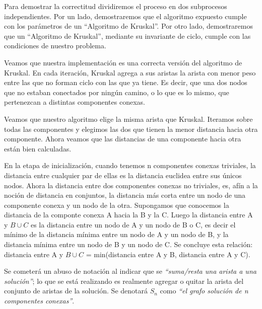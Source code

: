 \documentclass[11pt, a4paper, twoside]{article}
\begin{document}
{}

Para demostrar la correctitud dividiremos el proceso en dos subprocesos
independientes. Por un lado, demostraremos que el algoritmo expuesto cumple
con los parámetros de un ``Algoritmo de Kruskal''. Por otro lado,
demostraremos que un ``Algoritmo de Kruskal'', mediante su invariante de
ciclo, cumple con las condiciones de nuestro problema.


Veamos que nuestra implementación es una correcta versión del algoritmo de
Kruskal. En cada iteración, Kruskal agrega a sus aristas la arista con menor
peso entre las que no forman ciclo con las que ya tiene. Es decir, que una dos
nodos que no estaban conectados por ningún camino, o lo que es lo mismo, que
pertenezcan a distintas componentes conexas.

Veamos que nuestro algoritmo elige la misma arista que Kruskal. Iteramos sobre
todas las componentes y elegimos las dos que tienen la menor distancia hacia
otra componente. Ahora veamos que las distancias de una componente hacia otra
están bien calculadas.

En la etapa de inicialización, cuando tenemos n componentes conexas triviales,
la distancia entre cualquier par de ellas es la distancia euclidea entre sus
únicos nodos. Ahora la distancia entre dos componentes conexas no triviales,
es, afín a la noción de distancia en conjuntos, la distancia más corta entre
un nodo de una componente conexa y un nodo de la otra. Supongamos que
conocemos la distancia de la componte conexa A hacia la B y la C. Luego la
distancia entre A y $B \cup C$ es la distancia entre un nodo de A y un nodo de
B o C, es decir el mínimo de la distancia mínima entre un nodo de A y un nodo
de B, y la distancia mínima entre un nodo de B y un nodo de C. Se concluye
esta relación: distancia entre A y $B \cup C$ = min(distancia entre A y B,
distancia entre A y C).


\begin{aclaracion}

Se cometerá un abuso de notación al indicar que se \emph{``suma/resta una
arista a una solución''}; lo que se está realizando es realmente agregar o
quitar la arista del conjunto de aristas de la solución. Se denotará $S_{n}$
como \emph{``el grafo solución de n componentes conexas''}.

\end{aclaracion}
\end{document}
